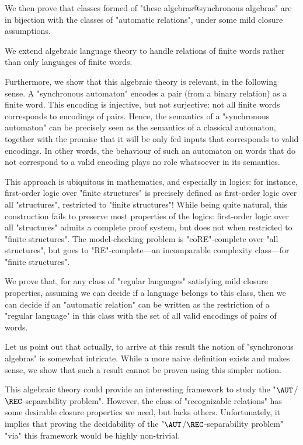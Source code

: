 We then prove that classes formed of "these algebras@synchronous algebras" 
are in bijection with the classes of "automatic relations", under some mild closure
assumptions. 

\begin{contribution}
	We extend algebraic language theory to handle relations of finite words
	rather than only languages of finite words.
\end{contribution}

Furthermore, we show that this algebraic theory is relevant, in the following sense.
A "synchronous automaton" encodes a pair (from a binary relation) as
a finite word. This encoding is injective, but not
surjective: not all finite words corresponds to encodings of pairs.
Hence, the semantics of a "synchronous automaton" can be precisely seen
as the semantics of a classical automaton, together with the promise that it will be only
fed inputs that corresponds to valid encodings. In other words,
the behaviour of such an automaton on words that do not correspond to a valid encoding
plays no role whatsoever in its semantics.

This approach is ubiquitous in mathematics, and especially in logics:
for instance, first-order logic over "finite structures" is precisely
defined as first-order logic over all "structures", restricted to "finite structures"!
While being quite natural, this construction fails to preserve most properties of the logics:
first-order logic over all "structures" admits a complete proof system,
but does not when restricted to "finite structures". The model-checking problem
is "coRE"-complete over "all structures", but goes to
"RE"-complete---an incomparable complexity class---for "finite structures".

\begin{contribution}
	We prove that, for any class of "regular languages" satisfying mild closure
	properties, assuming we can decide if a language belongs to this class,
	then we can decide if an "automatic relation" can be written as the restriction
	of a "regular language" in this class with the set of all valid encodings
	of pairs of words.
\end{contribution}

Let us point out that actually, to arrive at this result the notion
of "synchronous algebras" is somewhat intricate. While a more naive definition
exists and makes sense, we show that such a result cannot be proven using this
simpler notion.

This algebraic theory could provide an interesting framework to
study the "$\AUT$/$\REC$-separability problem".
However, the class of "recognizable relations" has some desirable
closure properties we need, but lacks others.
Unfortunately, it implies that proving the decidability of
the "$\AUT$/$\REC$-separability problem" "via" this framework would
be highly non-trivial.

